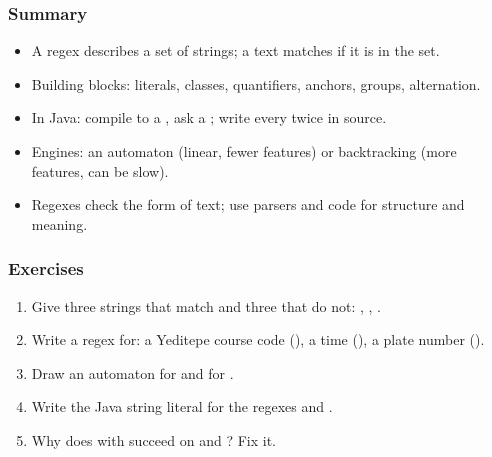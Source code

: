 \documentclass[aspectratio=169,10pt,compress]{beamer}
\begin{document}




\begin{frame}[t,fragile] \frametitle{Summary}
  \begin{itemize}\small
    \item A regex describes a set of strings; a text matches if it is in the set.
    \item Building blocks: literals, classes, quantifiers, anchors, groups, alternation.
    \item In Java: compile to a , ask a ; write every \hCode{\textbackslash} twice in source.
    \item Engines: an automaton (linear, fewer features) or backtracking (more features, can be slow).
    \item Regexes check the form of text; use parsers and code for structure and meaning.
  \end{itemize}
\end{frame}




\begin{frame}[t,fragile] \frametitle{Exercises}
  \begin{enumerate}\small
    \item Give three strings that match and three that do not: \hCode{[A-Z][a-z]+}, , .
    \item Write a regex for: a Yeditepe course code (), a time (), a plate number ().
    \item Draw an automaton for  and for .
    \item Write the Java string literal for the regexes  and .
    \item Why does  with  succeed on  and ? Fix it.
  \end{enumerate}
\end{frame}




\begin{frame}[t,fragile]
	\begin{center}
		\vspace{4cm}
	\end{center}
\end{frame}
\end{document}
